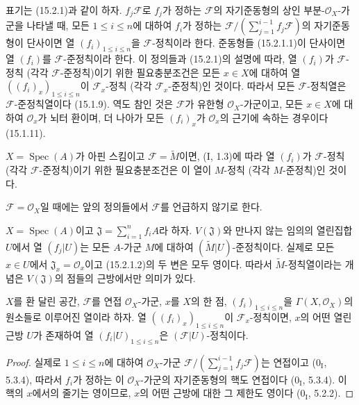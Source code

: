 \begin{env}[15.2.2]
\label{0.15.2.2-fr}
표기는 (15.2.1)과 같이 하자. $f_j\mathscr{F}$로 $f_j$가 정하는
$\mathscr{F}$의 자기준동형의 상인 부분-$\mathcal{O}_X$-가군을
나타낼 때, 모든 $1\leq i\leq n$에 대하여 $f_i$가 정하는
$\mathscr{F}/(\sum_{j=1}^{i-1}f_j\mathscr{F})$의 자기준동형이
단사이면 열 $(f_i)_{1\leq i\leq n}$을
$\mathscr{F}$-정칙이라 한다. 준동형들 (15.2.1.1)이 단사이면 열
$(f_i)$를 $\mathscr{F}$-준정칙이라 한다. 이 정의들과 (15.2.1)의
설명에 따라, 열 $(f_i)$가 $\mathscr{F}$-정칙 (각각
$\mathscr{F}$-준정칙)이기 위한 필요충분조건은 모든 $x\in X$에
대하여 열 $((f_i)_x)_{1\leq i\leq n}$이
$\mathscr{F}_x$-정칙 (각각 $\mathscr{F}_x$-준정칙)인 것이다.
따라서 모든 $\mathscr{F}$-정칙열은 $\mathscr{F}$-준정칙열이다
(15.1.9). 역도 참인 것은 $\mathscr{F}$가 유한형
$\mathcal{O}_X$-가군이고, 모든 $x\in X$에 대하여
$\mathcal{O}_x$가 뇌터 환이며, 더 나아가 모든 $(f_i)_x$가
$\mathcal{O}_x$의 근기에 속하는 경우이다 (15.1.11).

$X=\operatorname{Spec}(A)$가 아핀 스킴이고
$\mathscr{F}=\widetilde{M}$이면, (I, 1.3)에 따라 열 $(f_i)$가
$\mathscr{F}$-정칙 (각각 $\mathscr{F}$-준정칙)이기 위한
필요충분조건은 이 열이 $M$-정칙 (각각 $M$-준정칙)인 것이다.

$\mathscr{F}=\mathcal{O}_X$일 때에는 앞의 정의들에서
$\mathscr{F}$를 언급하지 않기로 한다.
\end{env}

\begin{remark}[15.2.3]
\label{0.15.2.3-fr}
$X=\operatorname{Spec}(A)$이고
$\mathfrak{J}=\sum_{i=1}^n f_iA$라 하자. $V(\mathfrak{J})$와 만나지
않는 임의의 열린집합 $U$에서 열 $(f_j|U)$는 모든 $A$-가군 $M$에
대하여 $(\widetilde{M}|U)$-준정칙이다. 실제로 모든 $x\in U$에서
$\mathfrak{J}_x=\mathcal{O}_x$이고 (15.2.1.2)의 두 변은 모두
영이다. 따라서 $\widetilde{M}$-정칙열이라는 개념은
$V(\mathfrak{J})$의 점들의 근방에서만 의미가 있다.
\end{remark}

\begin{proposition}[15.2.4]
\label{0.15.2.4-fr}
$X$를 환 달린 공간, $\mathscr{F}$를 연접 $\mathcal{O}_X$-가군,
$x$를 $X$의 한 점, $(f_i)_{1\leq i\leq n}$을
$\Gamma(X,\mathcal{O}_X)$의 원소들로 이루어진 열이라 하자. 열
$((f_i)_x)_{1\leq i\leq n}$이 $\mathscr{F}_x$-정칙이면, $x$의 어떤
열린근방 $U$가 존재하여 열 $(f_i|U)_{1\leq i\leq n}$은
$(\mathscr{F}|U)$-정칙이다.
\end{proposition}

\begin{proof}
실제로 $1\leq i\leq n$에 대하여 $\mathcal{O}_X$-가군
$\mathscr{F}/(\sum_{j=1}^{i-1}f_j\mathscr{F})$는 연접이고
($0_{\mathrm I}$, 5.3.4), 따라서 $f_i$가 정하는 이
$\mathcal{O}_X$-가군의 자기준동형의 핵도 연접이다
($0_{\mathrm I}$, 5.3.4). 이 핵의 $x$에서의 줄기는 영이므로, $x$의
어떤 근방에 대한 그 제한도 영이다 ($0_{\mathrm I}$, 5.2.2).
\end{proof}

